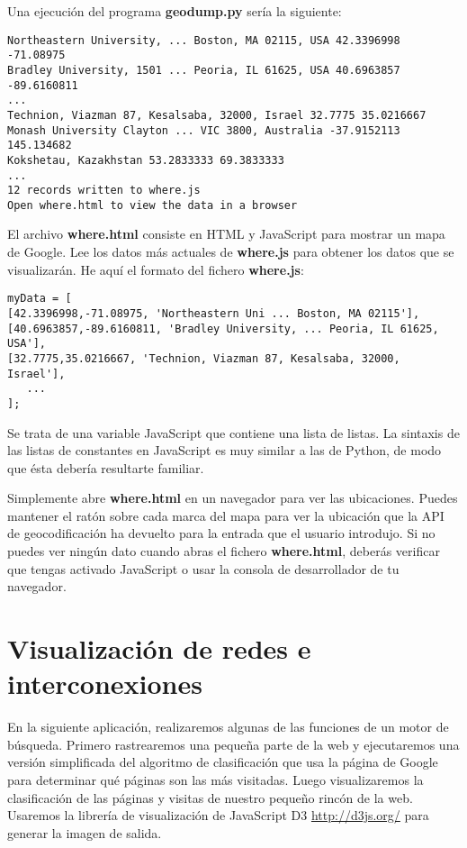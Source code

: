 Una ejecución del programa {\bf geodump.py} sería la siguiente: 

\beforeverb
\begin{verbatim}
Northeastern University, ... Boston, MA 02115, USA 42.3396998 -71.08975
Bradley University, 1501 ... Peoria, IL 61625, USA 40.6963857 -89.6160811
...
Technion, Viazman 87, Kesalsaba, 32000, Israel 32.7775 35.0216667
Monash University Clayton ... VIC 3800, Australia -37.9152113 145.134682
Kokshetau, Kazakhstan 53.2833333 69.3833333
...
12 records written to where.js
Open where.html to view the data in a browser
\end{verbatim}
\afterverb
%
El archivo {\bf where.html} consiste en HTML y JavaScript para mostrar
un mapa de Google. Lee los datos más actuales de {\bf where.js} para obtener
los datos que se visualizarán. He aquí el formato del fichero {\bf where.js}:

\beforeverb
\begin{verbatim}
myData = [
[42.3396998,-71.08975, 'Northeastern Uni ... Boston, MA 02115'],
[40.6963857,-89.6160811, 'Bradley University, ... Peoria, IL 61625, USA'],
[32.7775,35.0216667, 'Technion, Viazman 87, Kesalsaba, 32000, Israel'],
   ...
];
\end{verbatim}
\afterverb
%
Se trata de una variable JavaScript que contiene una lista de listas.
La sintaxis de las listas de constantes en JavaScript es muy similar a
las de Python, de modo que ésta debería resultarte familiar.

Simplemente abre {\bf where.html} en un navegador para ver las ubicaciones.
Puedes mantener el ratón sobre cada marca del mapa para ver la
ubicación que la API de geocodificación ha devuelto para la entrada que el usuario introdujo.
Si no puedes ver ningún dato cuando abras el fichero {\bf where.html}, deberás
verificar que tengas activado JavaScript o usar la consola de desarrollador de tu navegador.

\section{Visualización de redes e interconexiones}

En la siguiente aplicación, realizaremos algunas de las funciones de un motor
de búsqueda. Primero rastrearemos una pequeña parte de la web y ejecutaremos
una versión simplificada del algoritmo de clasificación que usa la página de Google
para determinar qué páginas son las más visitadas. Luego visualizaremos
la clasificación de las páginas y visitas de nuestro pequeño rincón de la web.
Usaremos la librería de visualización de JavaScript D3
\url{http://d3js.org/} para generar la imagen de salida.

